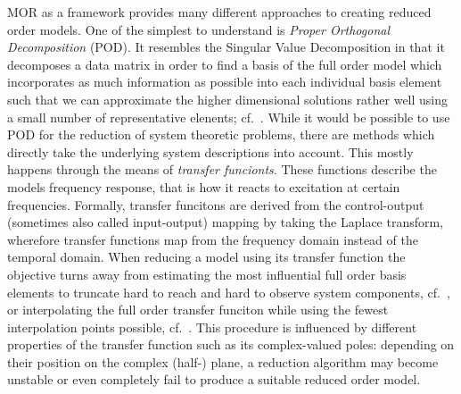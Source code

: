 \ac{MOR} as a framework provides many different approaches to creating reduced order models.
One of the simplest to understand is \emph{Proper Orthogonal Decomposition} (POD).
It resembles the Singular Value Decomposition in that it decomposes a data matrix in order to find a basis of the full order model which incorporates as much information as possible into each individual basis element such that we can approximate the higher dimensional solutions rather well using a small number of representative elenents; cf.~\cite{Hotelling1936, Karhunen1946, Pinnau2008}.
While it would be possible to use POD for the reduction of system theoretic problems, there are methods which directly take the underlying system descriptions into account.
This mostly happens through the means of \emph{transfer funcionts}.
These functions describe the models frequency response, that is how it reacts to excitation at certain frequencies.
Formally, transfer funcitons are derived from the control-output (sometimes also called input-output) mapping by taking the Laplace transform, wherefore transfer functions map from the frequency domain instead of the temporal domain.
When reducing a model using its transfer function the objective turns away from estimating the most influential full order basis elements to truncate hard to reach and hard to observe system components, cf.~\cite{Moore1981, Enns1984, Antoulas2005, Gugercin2007, BB2017}, or interpolating the full order transfer funciton while using the fewest interpolation points possible, cf.~\cite{Antoulas2005, Gugercin2009, Beattie2017}.
This procedure is influenced by different properties of the transfer function such as its complex-valued poles: depending on their position on the complex (half-) plane, a reduction algorithm may become unstable or even completely fail to produce a suitable reduced order model.

